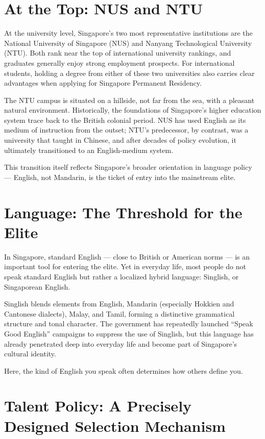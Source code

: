 \section{At the Top: NUS and NTU}

At the university level, Singapore's two most representative institutions are the National University of Singapore (NUS) and Nanyang Technological University (NTU). Both rank near the top of international university rankings, and graduates generally enjoy strong employment prospects. For international students, holding a degree from either of these two universities also carries clear advantages when applying for Singapore Permanent Residency.

The NTU campus is situated on a hillside, not far from the sea, with a pleasant natural environment. Historically, the foundations of Singapore's higher education system trace back to the British colonial period. NUS has used English as its medium of instruction from the outset; NTU's predecessor, by contrast, was a university that taught in Chinese, and after decades of policy evolution, it ultimately transitioned to an English-medium system.

This transition itself reflects Singapore's broader orientation in language policy --- English, not Mandarin, is the ticket of entry into the mainstream elite.

\section{Language: The Threshold for the Elite}

In Singapore, standard English --- close to British or American norms --- is an important tool for entering the elite. Yet in everyday life, most people do not speak standard English but rather a localized hybrid language: Singlish, or Singaporean English.

Singlish blends elements from English, Mandarin (especially Hokkien and Cantonese dialects), Malay, and Tamil, forming a distinctive grammatical structure and tonal character. The government has repeatedly launched ``Speak Good English'' campaigns to suppress the use of Singlish, but this language has already penetrated deep into everyday life and become part of Singapore's cultural identity.

Here, the kind of English you speak often determines how others define you.

\section{Talent Policy: A Precisely Designed Selection Mechanism}

